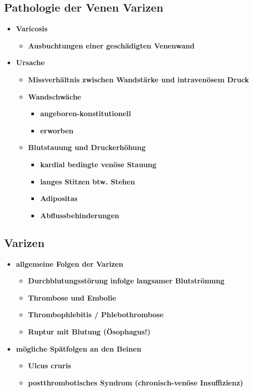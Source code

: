 	\subsection*{Pathologie der Venen Varizen}
		\begin{itemize}
			\item \textbf{Varicosis}
				\begin{itemize}
					\item \textbf{Ausbuchtungen einer geschädigten Venenwand}
				\end{itemize}
			\item \textbf{Ursache}
				\begin{itemize}
					\item \textbf{Missverhältnis zwischen Wandstärke und intravenösem Druck}
					\item \textbf{Wandschwäche}
						\begin{itemize}
							\item \textbf{angeboren-konstitutionell}
							\item \textbf{erworben}
						\end{itemize}
					\item \textbf{Blutstauung und Druckerhöhung}
						\begin{itemize}
							\item \textbf{kardial bedingte venöse Stauung}
							\item \textbf{langes Stitzen btw. Stehen}
							\item \textbf{Adipositas}
							\item \textbf{Abflussbehinderungen}
						\end{itemize}
			\end{itemize}
		\end{itemize}
	\subsection*{Varizen}
		\begin{itemize}
			\item \textbf{allgemeine Folgen der Varizen}
				\begin{itemize}
					\item \textbf{Durchblutungsstörung infolge langsamer Blutströmung}
					\item \textbf{Thrombose und Embolie}
					\item \textbf{Thrombophlebitis / Phlebothrombose}
					\item \textbf{Ruptur mit Blutung (Ösophagus!)}
				\end{itemize}
			\item \textbf{mögliche Spätfolgen an den Beinen}
				\begin{itemize}
					\item \textbf{Ulcus cruris}
					\item \textbf{postthrombotisches Syndrom (chronisch-venöse Insuffizienz)}
			\end{itemize}
		\end{itemize}
